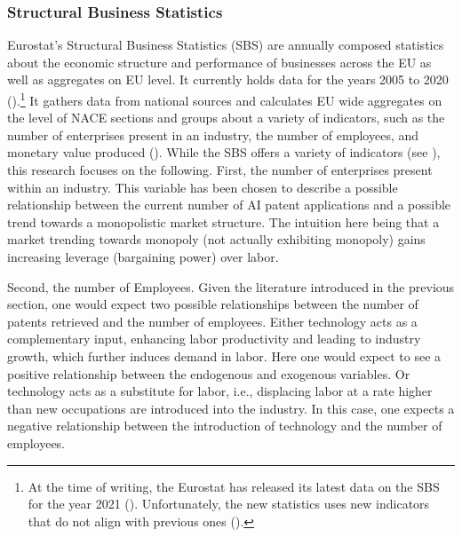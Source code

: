 \documentclass[
  12pt,
  a4paperpaper,
]{article}
\begin{document}
\subsubsection{Structural Business
Statistics}\label{structural-business-statistics}

Eurostat's Structural Business Statistics (SBS) are annually composed
statistics about the economic structure and performance of businesses
across the EU as well as aggregates on EU level. It currently holds data
for the years 2005 to 2020
().\footnote{At the time of writing, the
  Eurostat has released its latest data on the SBS for the year 2021
  ().
  Unfortunately, the new statistics uses new indicators that do not
  align with previous ones
  ().} It gathers data from national sources and
calculates EU wide aggregates on the level of NACE sections and groups
about a variety of indicators, such as the number of enterprises present
in an industry, the number of employees, and monetary value produced
(). While the SBS offers a variety of indicators (see
), this research focuses on the following. First, the number of
enterprises present within an industry. This variable has been chosen to
describe a possible relationship between the current number of AI patent
applications and a possible trend towards a monopolistic market
structure. The intuition here being that a market trending towards
monopoly (not actually exhibiting monopoly) gains increasing leverage
(bargaining power) over labor.

Second, the number of Employees. Given the literature introduced in the
previous section, one would expect two possible relationships between
the number of patents retrieved and the number of employees. Either
technology acts as a complementary input, enhancing labor productivity
and leading to industry growth, which further induces demand in labor.
Here one would expect to see a positive relationship between the
endogenous and exogenous variables. Or technology acts as a substitute
for labor, i.e., displacing labor at a rate higher than new occupations
are introduced into the industry. In this case, one expects a negative
relationship between the introduction of technology and the number of
employees.
\end{document}
